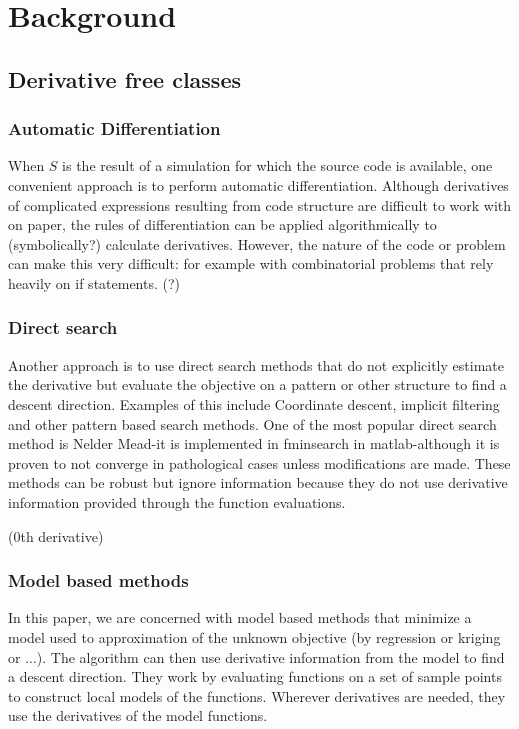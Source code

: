 \documentclass{article}
\begin{document}
\section{Background}
\subsection{Derivative free classes}
\subsubsection{Automatic Differentiation}

When $S$ is the result of a simulation for which the source code is available, one convenient approach is to perform automatic differentiation.
Although derivatives of complicated expressions resulting from code structure are difficult to work with on paper, the rules of differentiation can be applied algorithmically to (symbolically?) calculate derivatives.
However, the nature of the code or problem can make this very difficult: for example with combinatorial problems that rely heavily on if statements.
(?)

\subsubsection{Direct search}


Another approach is to use direct search methods that do not explicitly estimate the derivative but evaluate the objective on a pattern or other structure to find a descent direction.
Examples of this include Coordinate descent, implicit filtering and other pattern based search methods.
One of the most popular direct search method is Nelder Mead-it is implemented in fminsearch in matlab-although it is proven to not converge in pathological cases unless modifications are made.
These methods can be robust but ignore information because they do not use derivative information provided through the function evaluations.

(0th derivative)

\subsubsection{Model based methods}

In this paper, we are concerned with model based methods that minimize a model used to approximation of the unknown objective (by regression or kriging or ...).
The algorithm can then use derivative information from the model to find a descent direction.
They work by evaluating functions on a set of sample points to construct local models of the functions.
Wherever derivatives are needed, they use the derivatives of the model functions.
\end{document}

